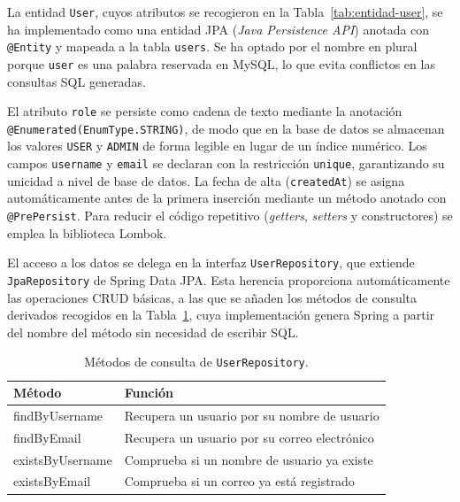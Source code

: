 \documentclass[12pt,a4paper,twoside,openright]{book}
\begin{document}
    La entidad \texttt{User}, cuyos atributos se recogieron en la
    Tabla~\ref{tab:entidad-user}, se ha implementado como una entidad JPA
    (\textit{Java Persistence API}) anotada con \texttt{@Entity} y mapeada a la
    tabla \texttt{users}. Se ha optado por el nombre en plural porque
    \texttt{user} es una palabra reservada en MySQL, lo que evita conflictos en
    las consultas SQL generadas.

    El atributo \texttt{role} se persiste como cadena de texto mediante la
    anotación \texttt{@Enumerated(EnumType.STRING)}, de modo que en la base de
    datos se almacenan los valores \texttt{USER} y \texttt{ADMIN} de forma
    legible en lugar de un índice numérico. Los campos \texttt{username} y
    \texttt{email} se declaran con la restricción \texttt{unique}, garantizando
    su unicidad a nivel de base de datos. La fecha de alta (\texttt{createdAt})
    se asigna automáticamente antes de la primera inserción mediante un método
    anotado con \texttt{@PrePersist}. Para reducir el código repetitivo
    (\textit{getters}, \textit{setters} y constructores) se emplea la
    biblioteca Lombok.

    El acceso a los datos se delega en la interfaz \texttt{UserRepository}, que
    extiende \texttt{JpaRepository} de Spring Data JPA. Esta herencia
    proporciona automáticamente las operaciones CRUD básicas, a las que se
    añaden los métodos de consulta derivados recogidos en la
    Tabla~\ref{tab:user-repository}, cuya implementación genera Spring a partir
    del nombre del método sin necesidad de escribir SQL.

    \begin{table}[htbp]
        \centering
        \begin{tabular}{ll}
            \toprule
            \textbf{Método} & \textbf{Función} \\
            \midrule
            findByUsername   & Recupera un usuario por su nombre de usuario \\
            findByEmail      & Recupera un usuario por su correo electrónico \\
            existsByUsername & Comprueba si un nombre de usuario ya existe \\
            existsByEmail    & Comprueba si un correo ya está registrado \\
            \bottomrule
        \end{tabular}
        \caption{Métodos de consulta de \texttt{UserRepository}.}
        \label{tab:user-repository}
    \end{table}
\end{document}
